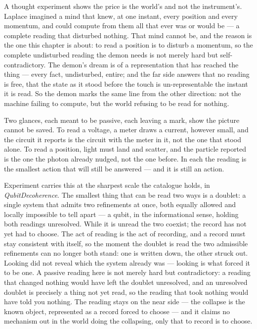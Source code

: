A thought experiment shows the price is the world's and not the instrument's.
Laplace imagined a mind that knew, at one instant, every position and every momentum, and could compute from them all
that ever was or would be --- a complete reading that disturbed nothing.
That mind cannot be, and the reason is the one this chapter is about: to read a position is to disturb a momentum, so
the complete undisturbed reading the demon needs is not merely hard but self-contradictory.
The demon's dream is of a representation that has reached the thing --- every fact, undisturbed, entire; and the far side
answers that no reading is free, that the state as it stood before the touch is un-representable the instant it is read.
So the demon marks the same line from the other direction: not the machine failing to compute, but the world refusing to
be read for nothing.

Two glances, each meant to be passive, each leaving a mark, show the picture cannot be saved.
To read a voltage, a meter draws a current, however small, and the circuit it reports is the circuit with the meter in
it, not the one that stood alone.
To read a position, light must land and scatter, and the particle reported is the one the photon already nudged, not the
one before.
In each the reading is the smallest action that will still be answered --- and it is still an action.

Experiment carries this at the sharpest scale the catalogue holds, in \emph{QubitDecoherence}.
The smallest thing that can be read two ways is a doublet: a single system that admits two refinements at once, both
equally allowed and locally impossible to tell apart --- a qubit, in the informational sense, holding both readings
unresolved.
While it is unread the two coexist; the record has not yet had to choose.
The act of reading is the act of recording, and a record must stay consistent with itself, so the moment the doublet is
read the two admissible refinements can no longer both stand: one is written down, the other struck out.
Looking did not reveal which the system already was --- looking is what forced it to be one.
A passive reading here is not merely hard but contradictory: a reading that changed nothing would have left the doublet
unresolved, and an unresolved doublet is precisely a thing not yet read, so the reading that took nothing would have told
you nothing.
The reading stays on the near side --- the collapse is the known object, represented as a record forced to choose --- and
it claims no mechanism out in the world doing the collapsing, only that to record is to choose.

